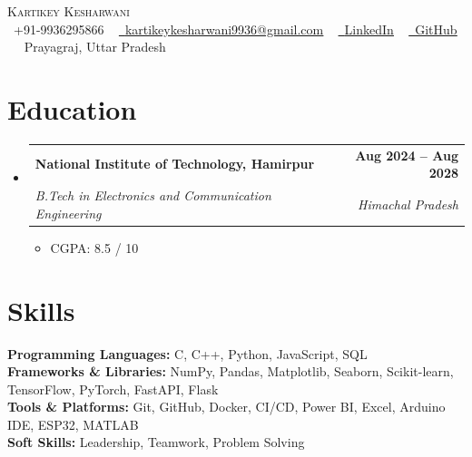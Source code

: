 \documentclass[letterpaper,11pt]{article}
\makeatletter
\newcommand{\resumeItem}[1]{\item\small{{#1 \vspace{-2pt}}}}
\newcommand{\resumeSubheading}[4]{
  \vspace{-2pt}\item
    \begin{tabular*}{1.0\textwidth}[t]{l@{\extracolsep{\fill}}r}
      \textbf{#1} & \textbf{\small #2} \\
      \textit{\small#3} & \textit{\small #4} \\
    \end{tabular*}\vspace{-6pt}
}
\newcommand{\resumeItemListStart}{\begin{itemize}}
\newcommand{\resumeItemListEnd}{\end{itemize}\vspace{-5pt}}
\newcommand{\resumeSubHeadingListStart}{\begin{itemize}[leftmargin=0.0in, label={}]}
\newcommand{\resumeSubHeadingListEnd}{\end{itemize}}
\makeatother
\begin{document}
\begin{center}
    {\Huge \scshape Kartikey Kesharwani} \\ \vspace{4pt}
    \small \faPhone\ +91-9936295866 ~
    \href{mailto:kartikeykesharwani9936@gmail.com}{\faEnvelope\ \underline{kartikeykesharwani9936@gmail.com}} ~
    \href{https://www.linkedin.com/in/kartikeykesharwani/}{\faLinkedin\ \underline{LinkedIn}} ~
    \href{https://github.com/kartikeykesharwani}{\faGithub\ \underline{GitHub}} ~
    \faMapMarker\ Prayagraj, Uttar Pradesh
\end{center}


\section{Education}
\resumeSubHeadingListStart
  \resumeSubheading
    {National Institute of Technology, Hamirpur}{Aug 2024 -- Aug 2028}
    {B.Tech in Electronics and Communication Engineering}{Himachal Pradesh}
    \resumeItemListStart
      \resumeItem{CGPA: 8.5 / 10}
    \resumeItemListEnd
\resumeSubHeadingListEnd

\section{Skills}
 \begin{itemize}[leftmargin=0.0in, label={}]
    \small{\item{
     \textbf{Programming Languages:} C, C++, Python, JavaScript, SQL \\
     \textbf{Frameworks \& Libraries:} NumPy, Pandas, Matplotlib, Seaborn, Scikit-learn, TensorFlow, PyTorch, FastAPI, Flask \\
     \textbf{Tools \& Platforms:} Git, GitHub, Docker, CI/CD, Power BI, Excel, Arduino IDE, ESP32, MATLAB \\
     \textbf{Soft Skills:} Leadership, Teamwork, Problem Solving
    }}
 \end{itemize}
\end{document}
